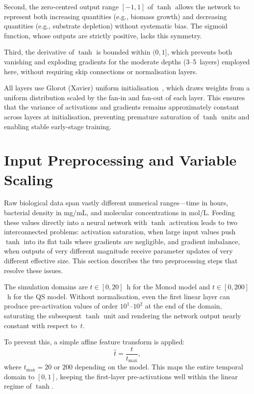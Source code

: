 \documentclass[14pt,a4paper,openany]{extbook}
\begin{document}
Second, the zero-centred output range $[-1, 1]$ of $\tanh$ allows the
network to represent both increasing quantities (e.g., biomass growth) and
decreasing quantities (e.g., substrate depletion) without systematic bias.
The sigmoid function, whose outputs are strictly positive, lacks this
symmetry.

Third, the derivative of $\tanh$ is bounded within $(0, 1]$, which prevents
both vanishing and exploding gradients for the moderate depths (3--5~layers)
employed here, without requiring skip connections or normalisation layers.

All layers use Glorot (Xavier) uniform
initialisation~\cite{glorot2010understanding}, which draws weights from a
uniform distribution scaled by the fan-in and fan-out of each layer.  This
ensures that the variance of activations and gradients remains approximately
constant across layers at initialisation, preventing premature saturation
of $\tanh$ units and enabling stable early-stage training.

\section{Input Preprocessing and Variable Scaling}
\label{sec:preprocessing}

Raw biological data span vastly different numerical ranges---time in hours,
bacterial density in mg/mL, and molecular concentrations in mol/L.  Feeding
these values directly into a neural network with $\tanh$ activation leads to two interconnected problems: activation saturation, when large input values push $\tanh$ into its flat tails where gradients are negligible, and gradient imbalance, when outputs of very different magnitude receive
parameter updates of very different effective size.  This section describes
the two preprocessing steps that resolve these issues.

The simulation domains are $t \in [0, 20]$~h for the Monod model and
$t \in [0, 200]$~h for the QS model.  Without normalisation, even the
first linear layer can produce pre-activation values of order
$10^1$--$10^2$ at the end of the domain, saturating the subsequent $\tanh$
unit and rendering the network output nearly constant with respect to~$t$.

To prevent this, a simple affine feature transform is applied:
\begin{equation}
\label{eq:time_norm}
\hat{t} = \frac{t}{t_{\max}},
\end{equation}
where $t_{\max} = 20$ or $200$ depending on the model.  This maps the
entire temporal domain to $[0, 1]$, keeping the first-layer pre-activations
well within the linear regime of $\tanh$.
\end{document}
